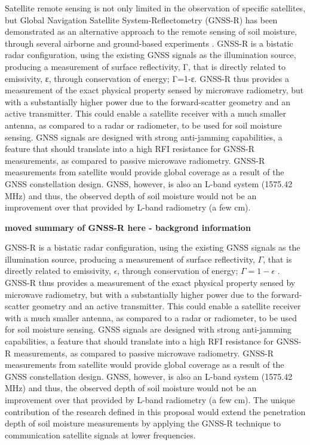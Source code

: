 \documentclass[draftcls,onecolumn]{IEEEtran}  %
\begin{document}
Satellite remote sensing is not only limited in the observation of specific satellites, but Global Navigation Satellite System-Reflectometry (GNSS-R) has been demonstrated as an alternative approach to the remote sensing of soil moisture, through several airborne and ground-based experiments \cite{Zavorotny:2010} \cite{Larson:2008}. GNSS-R is a bistatic radar configuration, using the existing GNSS signals as the illumination source, producing a measurement of surface reflectivity, Γ, that is directly related to emissivity, ε, through conservation of energy; Γ=1-ε. GNSS-R thus provides a measurement of the exact physical property sensed by microwave radiometry, but with a substantially higher power due to the forward-scatter geometry and an active transmitter. This could enable a satellite receiver with a much smaller antenna, as compared to a radar or radiometer, to be used for soil moisture sensing. GNSS signals are designed with strong anti-jamming capabilities, a feature that should translate into a high RFI resistance for GNSS-R measurements, as compared to passive microwave radiometry. GNSS-R measurements from satellite would provide global coverage as a result of the GNSS constellation design. GNSS, however, is also an L-band system (1575.42 MHz) and thus, the observed depth of soil moisture would not be an improvement over that provided by L-band radiometry (a few cm).

\bf moved summary of GNSS-R here - backgrond information

\rm
GNSS-R is a bistatic radar configuration, using the existing GNSS signals as the illumination source, producing a measurement of surface reflectivity, $\Gamma$, that is directly related to emissivity, $\epsilon$, through conservation of energy; $ \Gamma = 1 - \epsilon $ \cite{Jin:2011}. GNSS-R thus provides a measurement of the exact physical property sensed by microwave radiometry, but with a substantially higher power due to the forward-scatter geometry and an active transmitter. This could enable a satellite receiver with a much smaller antenna, as compared to a radar or radiometer, to be used for soil moisture sensing. GNSS signals are designed with strong anti-jamming capabilities, a feature that should translate into a high RFI resistance for GNSS-R measurements, as compared to passive microwave radiometry. GNSS-R measurements from satellite would provide global coverage as a result of the GNSS constellation design. GNSS, however, is also an L-band system (1575.42 MHz) and thus, the observed depth of soil moisture would not be an improvement over that provided by L-band
radiometry (a few cm). The unique contribution of the research defined in this proposal would extend the penetration depth of soil moisture measurements by applying the GNSS-R technique to communication satellite signals at lower frequencies.
\end{document}
